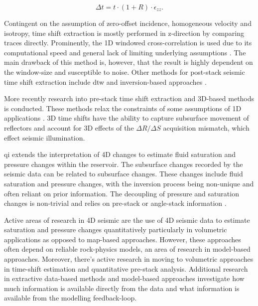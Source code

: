 \begin{equation}
    \Delta t = t \cdot (1 + R) \cdot \epsilon_{zz}.
\end{equation}

Contingent on the assumption of zero-offset incidence, homogeneous velocity and isotropy, time shift extraction is mostly performed in z-direction by comparing traces directly. Prominently, the 1D windowed cross-correlation is used due to its computational speed and general lack of limiting underlying assumptions \citep{Rickett2001-nx}. The main drawback of this method is, however, that the result is highly dependent on the window-size and susceptible to noise. Other methods for post-stack seismic time shift extraction include \ac{dtw} \citep{Hale2013} and inversion-based approaches \citep{Rickett2007-yo}. 

More recently research into pre-stack time shift extraction and 3D-based methods is conducted. These methods relax the constraints of some assumptions of 1D applications \citep{ghaderi2005pre, hall2002time}. 3D time shifts have the ability to capture subsurface movement of reflectors and account for 3D effects of the $\Delta R / \Delta S$ acquisition mismatch, which effect seismic illumination.

\acf{qi} extends the interpretation of 4D changes to estimate fluid saturation and pressure changes within the reservoir. The subsurface changes recorded by the seismic data can be related to subsurface changes. These changes include fluid saturation and pressure changes, with the inversion process being non-unique and often reliant on prior information. The decoupling of pressure and saturation changes is non-trivial and relies on pre-stack or angle-stack information \citep{Landro2001-rz}.

Active areas of research in 4D seismic are the use of 4D seismic data to estimate saturation and pressure changes quantitatively particularly in volumetric applications as opposed to map-based approaches. However, these approaches often depend on reliable rock-physics models, an area of research in model-based approaches. Moreover, there's active research in moving to volumetric approaches in time-shift estimation and quantitative pre-stack analysis. Additional research in extractive data-based methods and model-based approaches investigate how much information is available directly from the data and what information is available from the modelling feedback-loop.